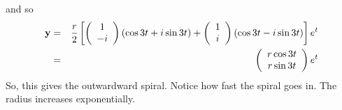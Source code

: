 \documentclass[12pt]{article}
\begin{document}
{and so
\begin{eqnarray*}
{\bf y}&=&\frac{r}{2}\left[\left(\begin{array}{cc}1\\-i\end{array}\right)(\cos{3t}+i\sin{3t})+\left(\begin{array}{cc}1\\i\end{array}\right)(\cos{3t}-i\sin{3t})\right]e^{t}\\
&=&\left(\begin{array}{cc} r\cos{3t}\\ r\sin{3t}\end{array}\right)e^{t}
\end{eqnarray*}
So, this gives the outwardward spiral. Notice how fast the spiral goes
in. The radius increases exponentially.
\begin{center}
\end{center}
}
\end{document}
